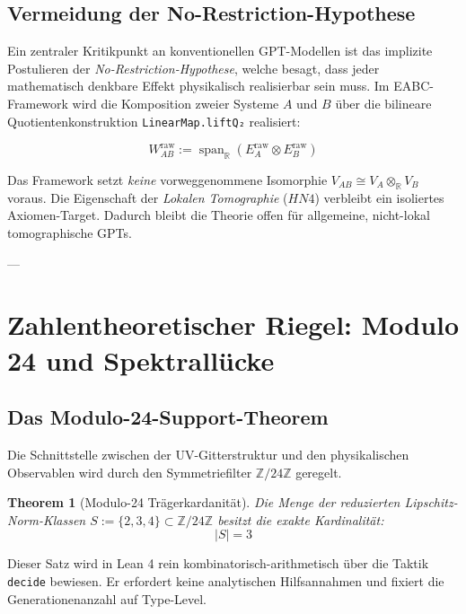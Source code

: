 \documentclass[11pt,a4paper]{article}
\newtheorem{theorem}{Theorem}[section]
\begin{document}
\subsection{Vermeidung der No-Restriction-Hypothese}

Ein zentraler Kritikpunkt an konventionellen GPT-Modellen ist das implizite Postulieren der \emph{No-Restriction-Hypothese}, welche besagt, dass jeder mathematisch denkbare Effekt physikalisch realisierbar sein muss. Im EABC-Framework wird die Komposition zweier Systeme $A$ und $B$ über die bilineare Quotientenkonstruktion \texttt{LinearMap.liftQ₂} realisiert:

\begin{equation}
W_{AB}^{\text{raw}} := \operatorname{span}_{\mathbb{R}} \left( E_A^{\text{raw}} \otimes E_B^{\text{raw}} \right)
\end{equation}

Das Framework setzt \emph{keine} vorweggenommene Isomorphie $V_{AB} \cong V_A \otimes_{\mathbb{R}} V_B$ voraus. Die Eigenschaft der \emph{Lokalen Tomographie} ($HN4$) verbleibt ein isoliertes Axiomen-Target. Dadurch bleibt die Theorie offen für allgemeine, nicht-lokal tomographische GPTs.

---

\section{Zahlentheoretischer Riegel: Modulo 24 und Spektrallücke}

\subsection{Das Modulo-24-Support-Theorem}

Die Schnittstelle zwischen der UV-Gitterstruktur und den physikalischen Observablen wird durch den Symmetriefilter $\mathbb{Z}/24\mathbb{Z}$ geregelt.

\begin{theorem}[Modulo-24 Trägerkardanität]
Die Menge der reduzierten Lipschitz-Norm-Klassen $S := \{2, 3, 4\} \subset \mathbb{Z}/24\mathbb{Z}$ besitzt die exakte Kardinalität:
\begin{equation}
|S| = 3
\end{equation}
\end{theorem}

Dieser Satz wird in Lean 4 rein kombinatorisch-arithmetisch über die Taktik \texttt{decide} bewiesen. Er erfordert keine analytischen Hilfsannahmen und fixiert die Generationenanzahl auf Type-Level.
\end{document}
